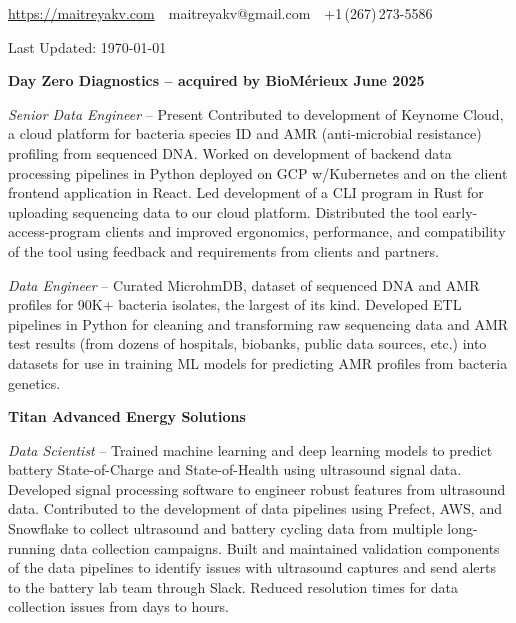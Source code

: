 \documentclass[letterpaper,MMMyyyy,nonstopmode]{simpleresumecv}
\newcommand{\CVAuthor}{Maitreya Venkataswamy}
\newcommand{\CVWebpage}{}
\begin{document}
\Title{\CVAuthor}

\begin{SubTitle}
\url{https://maitreyakv.com}
\,\SubBulletSymbol\,
maitreyakv@gmail.com
\,\SubBulletSymbol\,
+1\,(267)\,273-5586
\href{\CVWebpage}
{\url{\CVWebpage}}
\par
\par
Last Updated: \today
\end{SubTitle}

\begin{Body}


\Entry \textbf{Day Zero Diagnostics -- acquired by BioM\'erieux June 2025}

\Gap

\BulletItem \textit{Senior Data Engineer}
\hfill
{} -- Present
\SubBulletItem
  Contributed to development of Keynome Cloud, a cloud platform for bacteria species ID and AMR (anti-microbial resistance) profiling from sequenced DNA. Worked on development of backend data processing pipelines in Python deployed on GCP w/Kubernetes and on the client frontend application in React.
\SubBulletItem
Led development of a CLI program in Rust for uploading sequencing data to our cloud platform. Distributed the tool early-access-program clients and improved ergonomics, performance, and compatibility of the tool using feedback and requirements from clients and partners. 

\Gap

\BulletItem \textit{Data Engineer}
\hfill
{} -- 
\SubBulletItem
Curated MicrohmDB, dataset of sequenced DNA and AMR profiles for 90K+ bacteria isolates, the largest of its kind. Developed ETL pipelines in Python for cleaning and transforming raw sequencing data and AMR test results (from dozens of hospitals, biobanks, public data sources, etc.) into datasets for use in training ML models for predicting AMR profiles from bacteria genetics.

\BigGap

\Entry \textbf{Titan Advanced Energy Solutions}

\Gap

\BulletItem \textit{Data Scientist}
\hfill
{} -- 
\SubBulletItem
Trained machine learning and deep learning models to predict battery State-of-Charge and State-of-Health using ultrasound signal data. Developed signal processing software to engineer robust features from ultrasound data.
\SubBulletItem
Contributed to the development of data pipelines using Prefect, AWS, and Snowflake to collect ultrasound and battery cycling data from multiple long-running data collection campaigns.
\SubBulletItem
Built and maintained validation components of the data pipelines to identify issues with ultrasound captures and send alerts to the battery lab team through Slack. Reduced resolution times for data collection issues from days to hours.


\end{Body}
\end{document}
